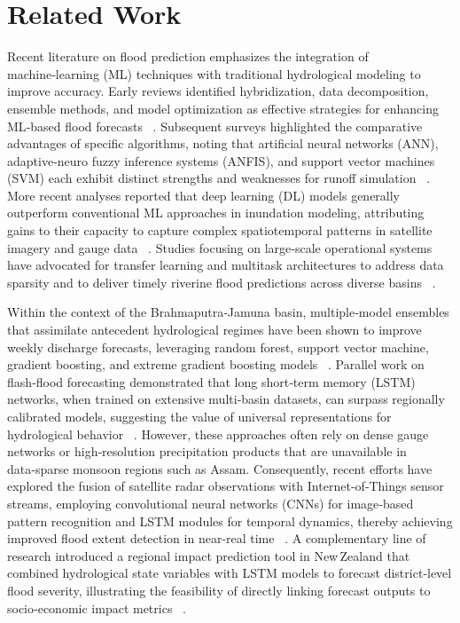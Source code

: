 \documentclass[conference]{IEEEtran}
\begin{document}
\section{Related Work}
Recent literature on flood prediction emphasizes the integration of machine‑learning (ML) techniques with traditional hydrological modeling to improve accuracy. Early reviews identified hybridization, data decomposition, ensemble methods, and model optimization as effective strategies for enhancing ML‑based flood forecasts ~\cite{mosavi2018c1}. Subsequent surveys highlighted the comparative advantages of specific algorithms, noting that artificial neural networks (ANN), adaptive‑neuro fuzzy inference systems (ANFIS), and support vector machines (SVM) each exhibit distinct strengths and weaknesses for runoff simulation ~\cite{mohammadi2021c2}. More recent analyses reported that deep learning (DL) models generally outperform conventional ML approaches in inundation modeling, attributing gains to their capacity to capture complex spatiotemporal patterns in satellite imagery and gauge data ~\cite{karim2023c3,ghorpade2021c5}. Studies focusing on large‑scale operational systems have advocated for transfer learning and multitask architectures to address data sparsity and to deliver timely riverine flood predictions across diverse basins ~\cite{nevo2019c9,nevo2019c15}.

Within the context of the Brahmaputra‑Jamuna basin, multiple‑model ensembles that assimilate antecedent hydrological regimes have been shown to improve weekly discharge forecasts, leveraging random forest, support vector machine, gradient boosting, and extreme gradient boosting models ~\cite{rahim2024c12}. Parallel work on flash‑flood forecasting demonstrated that long short‑term memory (LSTM) networks, when trained on extensive multi‑basin datasets, can surpass regionally calibrated models, suggesting the value of universal representations for hydrological behavior ~\cite{kratzert2019c16,le2019c17}. However, these approaches often rely on dense gauge networks or high‑resolution precipitation products that are unavailable in data‑sparse monsoon regions such as Assam. Consequently, recent efforts have explored the fusion of satellite radar observations with Internet‑of‑Things sensor streams, employing convolutional neural networks (CNNs) for image‑based pattern recognition and LSTM modules for temporal dynamics, thereby achieving improved flood extent detection in near‑real time ~\cite{awasthi2025c13}. A complementary line of research introduced a regional impact prediction tool in New Zealand that combined hydrological state variables with LSTM models to forecast district‑level flood severity, illustrating the feasibility of directly linking forecast outputs to socio‑economic impact metrics ~\cite{mourot2022c14}.
\end{document}
